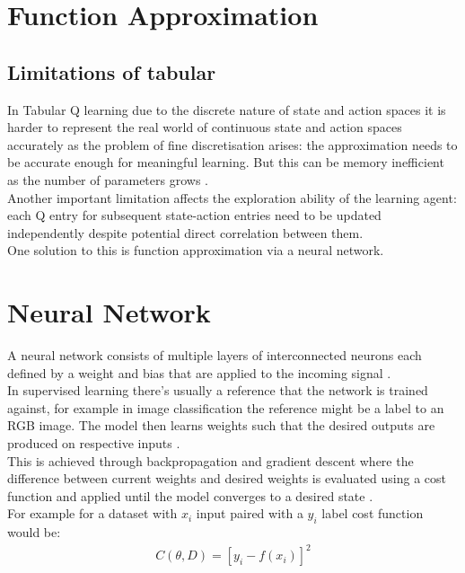 \section{Function Approximation}

\subsection{Limitations of tabular}

In Tabular Q learning due to the discrete nature of 
state and action spaces it is harder to represent the real world of continuous state and action spaces accurately as the problem of fine discretisation arises: the approximation needs to be accurate enough for meaningful learning. But this can be memory inefficient as the number of parameters grows \cite{lecture_intro_to_deep_rl}. \\

Another important limitation affects the exploration ability of the learning agent: each Q entry for subsequent state-action entries need to be updated independently despite potential direct correlation between them. \\

One solution to this is function approximation via a neural network.

\section{Neural Network}

A neural network consists of multiple layers of interconnected neurons each defined by a weight and bias that are applied to the incoming signal \cite{lecture_intro_to_deep_rl}.\\

In supervised learning there's usually a reference that 
the network is trained against, for example in image classification the reference might be a label to an RGB image. The model then learns weights such that the desired outputs are produced on respective inputs \cite{lecture_intro_to_deep_rl} . \\

This is achieved through backpropagation and gradient
descent where the difference between current weights and
desired weights is evaluated using a cost function and
applied until the model converges to a desired state
\cite{lecture_intro_to_deep_rl} .\\

For example for a dataset with $x_i$ input paired with a $y_i$ label cost function would be: 
\begin{align}
    C(\theta, D) = [y_i - f(x_i)]^2
\end{align}

